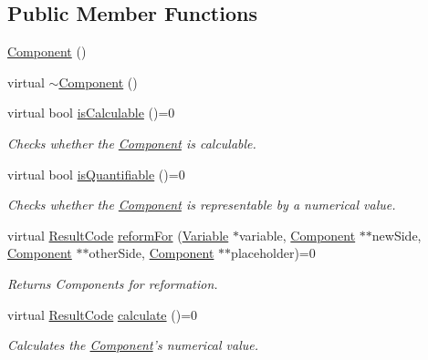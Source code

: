 \subsection*{Public Member Functions}
\begin{DoxyCompactItemize}
\item 
\hyperlink{classkissms_1_1_component_ab5dbfef5bbb55dfbcc91de7cc70b78c7}{Component} ()
\item 
virtual \hyperlink{classkissms_1_1_component_a873c6f07a8fd5d4570dfd525fa703752}{$\sim$\-Component} ()
\item 
virtual bool \hyperlink{classkissms_1_1_component_a442885b45058f07566a0e52192f13cef}{is\-Calculable} ()=0
\begin{DoxyCompactList}\small\item\em Checks whether the \hyperlink{classkissms_1_1_component}{Component} is calculable. \end{DoxyCompactList}\item 
virtual bool \hyperlink{classkissms_1_1_component_aa919cd3999147b744975aea91c7d2928}{is\-Quantifiable} ()=0
\begin{DoxyCompactList}\small\item\em Checks whether the \hyperlink{classkissms_1_1_component}{Component} is representable by a numerical value. \end{DoxyCompactList}\item 
virtual \hyperlink{namespacekissms_a006cc132ffcae81e38527977e0846e0e}{Result\-Code} \hyperlink{classkissms_1_1_component_afed1b31c97ebe0113fc0890cbd50f005}{reform\-For} (\hyperlink{classkissms_1_1_variable}{Variable} $\ast$variable, \hyperlink{classkissms_1_1_component}{Component} $\ast$$\ast$new\-Side, \hyperlink{classkissms_1_1_component}{Component} $\ast$$\ast$other\-Side, \hyperlink{classkissms_1_1_component}{Component} $\ast$$\ast$placeholder)=0
\begin{DoxyCompactList}\small\item\em Returns Components for reformation. \end{DoxyCompactList}\item 
virtual \hyperlink{namespacekissms_a006cc132ffcae81e38527977e0846e0e}{Result\-Code} \hyperlink{classkissms_1_1_component_a256b837afb2726a85fe81a39599a35ff}{calculate} ()=0
\begin{DoxyCompactList}\small\item\em Calculates the \hyperlink{classkissms_1_1_component}{Component}'s numerical value. \end{DoxyCompactList}\end{DoxyCompactItemize}


